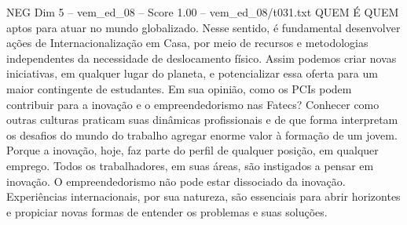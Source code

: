 \begin{textsample}{NEG Dim 5 – vem\_ed\_08 – Score 1.00 – vem\_ed\_08/t031.txt}  \label{ex:f5_neg_024}
QUEM É QUEM aptos para atuar no mundo globalizado.
Nesse sentido, é fundamental desenvolver ações de Internacionalização em Casa, por meio de recursos e metodologias independentes da necessidade de deslocamento físico.
Assim podemos criar novas iniciativas, em qualquer lugar do planeta, e potencializar essa oferta para um maior contingente de estudantes.
Em sua opinião, como os PCIs podem contribuir para a inovação e o empreendedorismo nas Fatecs?
Conhecer como outras culturas praticam suas dinâmicas profissionais e de que forma interpretam os desafios do mundo do trabalho agregar enorme valor à formação de um jovem.
Porque a inovação, hoje, faz parte do perfil de qualquer posição, em qualquer emprego.
Todos os trabalhadores, em suas áreas, são instigados a pensar em inovação.
O empreendedorismo não pode estar dissociado da inovação.
Experiências internacionais, por sua natureza, são essenciais para abrir horizontes e propiciar novas formas de entender os problemas e suas soluções.

\end{textsample}
